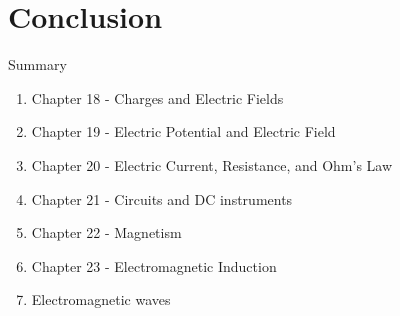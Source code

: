 \documentclass{beamer}
\begin{document}
\section{Conclusion}

\begin{frame}{Summary}
\begin{enumerate}
\item Chapter 18 - Charges and Electric Fields
\item Chapter 19 - Electric Potential and Electric Field
\item Chapter 20 - Electric Current, Resistance, and Ohm's Law
\item Chapter 21 - Circuits and DC instruments
\item Chapter 22 - Magnetism
\item Chapter 23 - Electromagnetic Induction
\item Electromagnetic waves
\end{enumerate}
\end{frame}
\end{document}
